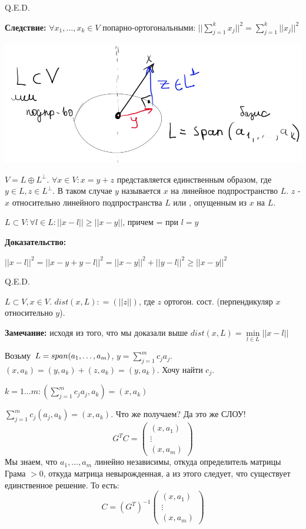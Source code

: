 \hfill Q.E.D.

\textbf{Следствие:} $\forall x_1,\ldots ,x_k \in V$ попарно-ортогональными: $||\sum\limits_{j=1}^k x_j||^2 = \sum\limits_{j=1}^k||x_j||^2$


\begin{center}
   \includegraphics[width = 10 cm]{assets/9_4-orthogonal-projection.png}
\end{center}

$V = L \oplus L^\perp$. $\forall x \in V: x = y + z$ представляется единственным образом, где $y\in L, z\in L^\perp$. В таком случае $y$ называется  $x$ на линейное подпространство $L$. $z$ -  $x$ относительно линейного подпространства $L$ или , опущенным из $x$ на $L$.


$L \subset V: \forall  l \in L: ||x-l|| \geq ||x-y||$, причем = при $l=y$

\textbf{Доказательство:}

$||x-l||^2 = ||x-y +y - l||^2 = ||x-y||^2 + ||y-l||^2 \geq ||x-y||^2$

\hfill Q.E.D.

 $L \subset V, x\in V$. $dist(x,L) : = (||z||)$, где $z$ ортогон. сост. (перпендикуляр $x$ относительно $y$).

\textbf{Замечание:} исходя из того, что мы доказали выше $dist(x,L) =\min\limits_{l\in L} ||x-l||$


Возьму $L = span(a_1,\ldots, a_m)$, $y= \sum\limits_{j=1}^{m}c_ja_j$. $(x,a_k) = (y,a_k) + (z,a_k)= (y,a_k)$. Хочу найти $c_j$.

$k = 1\ldots m: \left(\sum\limits_{j=1}^m c_j a_j, a_k\right) = (x,a_k)$

$\sum\limits_{j=1}^m c_j (a_j, a_k) =(x,a_k)$. Что же получаем? Да это же СЛОУ!
$$G^TC = \begin{pmatrix}
    (x,a_1)\\
    \vdots \\
    (x,a_m)
\end{pmatrix}$$
Мы знаем, что $a_1,\ldots , a_m$ линейно независимы, откуда определитель матрицы Грама $>0$, откуда матрица невырожденная, а из этого следует, что существует единственное решение. То есть:
$$C = (G^T)^{-1}\begin{pmatrix}
    (x,a_1)\\
    \vdots \\
    (x,a_m)
\end{pmatrix}$$

